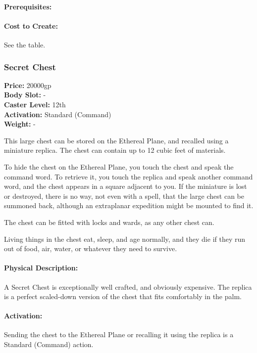 \paragraph{Prerequisites:} 

\paragraph{Cost to Create:} See the  table.

\subsubsection{Secret Chest}
\textbf{Price:} 20000gp\\
\textbf{Body Slot:} -\\
\textbf{Caster Level:} 12th\\
\textbf{Activation:} Standard (Command)\\
\textbf{Weight:} -

This large chest can be stored on the Ethereal Plane, and recalled using a miniature replica. The chest can contain up to 12 cubic feet of materials.

To hide the chest on the Ethereal Plane, you touch the chest and speak the command word. To retrieve it, you touch the replica and speak another command word, and the chest appears in a square adjacent to you. If the miniature is lost or destroyed, there is no way, not even with a  spell, that the large chest can be summoned back, although an extraplanar expedition might be mounted to find it.

The chest can be fitted with locks and wards, as any other chest can.

Living things in the chest eat, sleep, and age normally, and they die if they run out of food, air, water, or whatever they need to survive.

\paragraph{Physical Description:} A Secret Chest is exceptionally well crafted, and obviously expensive. The replica is a perfect scaled-down version of the chest that fits comfortably in the palm.

\paragraph{Activation:} Sending the chest to the Ethereal Plane or recalling it using the replica is a Standard (Command) action. 

